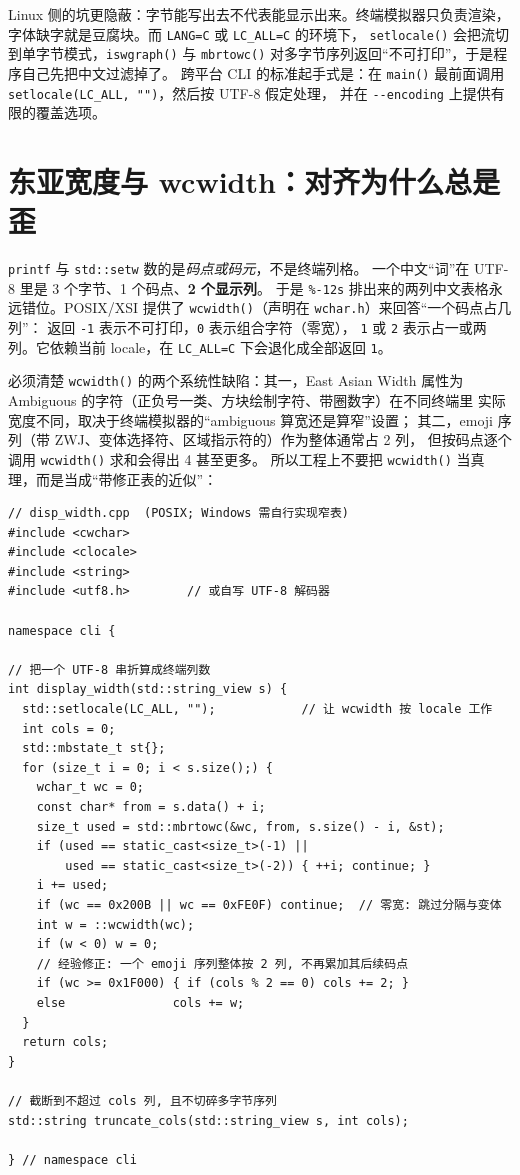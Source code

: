 \documentclass[12pt,a4paper,fontset=fandol]{ctexbook}
\newcommand{\Fn}[1]{\texttt{#1()}}
\newcommand{\Tp}[1]{\texttt{#1}}
\newcommand{\Opt}[1]{\texttt{-\/-#1}}
\begin{document}
Linux 侧的坑更隐蔽：字节能写出去不代表能显示出来。终端模拟器只负责渲染，
字体缺字就是豆腐块。而 \Tp{LANG=C} 或 \Tp{LC\_ALL=C} 的环境下，
\Fn{setlocale} 会把流切到单字节模式，\Fn{iswgraph} 与 \Fn{mbrtowc}
对多字节序列返回``不可打印''，于是程序自己先把中文过滤掉了。
跨平台 CLI 的标准起手式是：在 \Fn{main} 最前面调用
\lstinline|setlocale(LC_ALL, "")|，然后按 UTF-8 假定处理，
并在 \Opt{encoding} 上提供有限的覆盖选项。

\section{东亚宽度与 wcwidth：对齐为什么总是歪}

\verb|printf| 与 \Tp{std::setw} 数的是\emph{码点或码元}，不是终端列格。
一个中文``词''在 UTF-8 里是 3 个字节、1 个码点、\textbf{2 个显示列}。
于是 \Tp{\%-12s} 排出来的两列中文表格永远错位。POSIX/XSI 提供了
\Fn{wcwidth}（声明在 \Tp{wchar.h}）来回答``一个码点占几列''：
返回 \Tp{-1} 表示不可打印，\Tp{0} 表示组合字符（零宽），
\Tp{1} 或 \Tp{2} 表示占一或两列。它依赖当前 locale，在
\Tp{LC\_ALL=C} 下会退化成全部返回 \Tp{1}。

必须清楚 \Fn{wcwidth} 的两个系统性缺陷：其一，East Asian Width 属性为
Ambiguous 的字符（正负号一类、方块绘制字符、带圈数字）在不同终端里
实际宽度不同，取决于终端模拟器的``ambiguous 算宽还是算窄''设置；
其二，emoji 序列（带 ZWJ、变体选择符、区域指示符的）作为整体通常占 2 列，
但按码点逐个调用 \Fn{wcwidth} 求和会得出 4 甚至更多。
所以工程上不要把 \Fn{wcwidth} 当真理，而是当成``带修正表的近似''：

\begin{lstlisting}[caption={显示列宽计算：wcwidth 加 emoji 修正}]
// disp_width.cpp  (POSIX; Windows 需自行实现窄表)
#include <cwchar>
#include <clocale>
#include <string>
#include <utf8.h>        // 或自写 UTF-8 解码器

namespace cli {

// 把一个 UTF-8 串折算成终端列数
int display_width(std::string_view s) {
  std::setlocale(LC_ALL, "");            // 让 wcwidth 按 locale 工作
  int cols = 0;
  std::mbstate_t st{};
  for (size_t i = 0; i < s.size();) {
    wchar_t wc = 0;
    const char* from = s.data() + i;
    size_t used = std::mbrtowc(&wc, from, s.size() - i, &st);
    if (used == static_cast<size_t>(-1) ||
        used == static_cast<size_t>(-2)) { ++i; continue; }
    i += used;
    if (wc == 0x200B || wc == 0xFE0F) continue;  // 零宽: 跳过分隔与变体
    int w = ::wcwidth(wc);
    if (w < 0) w = 0;
    // 经验修正: 一个 emoji 序列整体按 2 列, 不再累加其后续码点
    if (wc >= 0x1F000) { if (cols % 2 == 0) cols += 2; }
    else               cols += w;
  }
  return cols;
}

// 截断到不超过 cols 列, 且不切碎多字节序列
std::string truncate_cols(std::string_view s, int cols);

} // namespace cli
\end{lstlisting}
\end{document}
